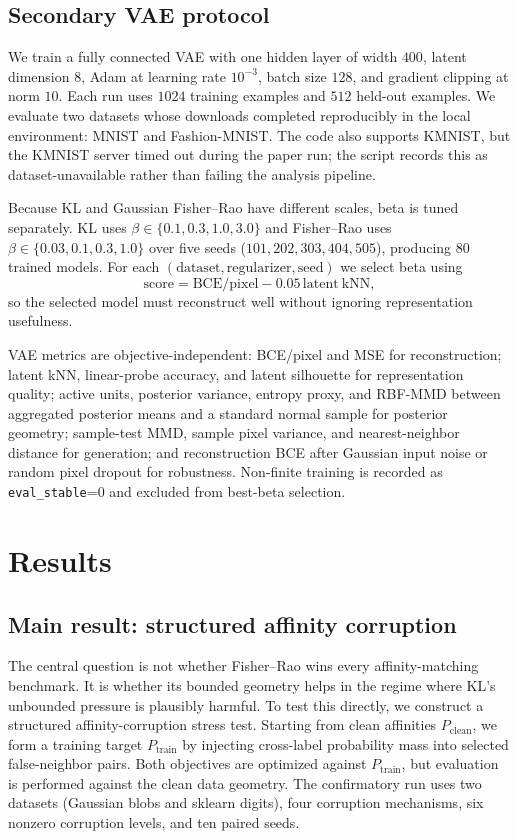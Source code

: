 \documentclass[11pt]{article}
\begin{document}
\subsection{Secondary VAE protocol}
\label{sec:vae-methods}

We train a fully connected VAE with one hidden layer of width $400$, latent dimension $8$,
Adam at learning rate $10^{-3}$, batch size $128$, and gradient clipping at norm $10$. Each
run uses $1024$ training examples and $512$ held-out examples. We evaluate two datasets whose
downloads completed reproducibly in the local environment: MNIST and Fashion-MNIST. The code
also supports KMNIST, but the KMNIST server timed out during the paper run; the script records
this as dataset-unavailable rather than failing the analysis pipeline.

Because KL and Gaussian Fisher--Rao have different scales, beta is tuned separately. KL uses
$\beta\in\{0.1,0.3,1.0,3.0\}$ and Fisher--Rao uses
$\beta\in\{0.03,0.1,0.3,1.0\}$ over five seeds
($101,202,303,404,505$), producing $80$ trained models. For each
$(\text{dataset},\text{regularizer},\text{seed})$ we select beta using
\[
  \mathrm{score} = \mathrm{BCE/pixel} - 0.05\,\mathrm{latent\ kNN},
\]
so the selected model must reconstruct well without ignoring representation usefulness.

VAE metrics are objective-independent: BCE/pixel and MSE for reconstruction; latent kNN,
linear-probe accuracy, and latent silhouette for representation quality; active units,
posterior variance, entropy proxy, and RBF-MMD between aggregated posterior means and a
standard normal sample for posterior geometry; sample-test MMD, sample pixel variance, and
nearest-neighbor distance for generation; and reconstruction BCE after Gaussian input noise
or random pixel dropout for robustness. Non-finite training is recorded as
\texttt{eval\_stable}=0 and excluded from best-beta selection.

\section{Results}
\label{sec:results}

\subsection{Main result: structured affinity corruption}
\label{sec:structured-corruption}

The central question is not whether Fisher--Rao wins every affinity-matching benchmark. It is
whether its bounded geometry helps in the regime where KL's unbounded pressure is plausibly
harmful. To test this directly, we construct a structured affinity-corruption stress test.
Starting from clean affinities $P_{\mathrm{clean}}$, we form a training target
$P_{\mathrm{train}}$ by injecting cross-label probability mass into selected false-neighbor
pairs. Both objectives are optimized against $P_{\mathrm{train}}$, but evaluation is performed
against the clean data geometry. The confirmatory run uses two datasets (Gaussian blobs and
sklearn digits), four corruption mechanisms, six nonzero corruption levels, and ten paired
seeds.
\end{document}
